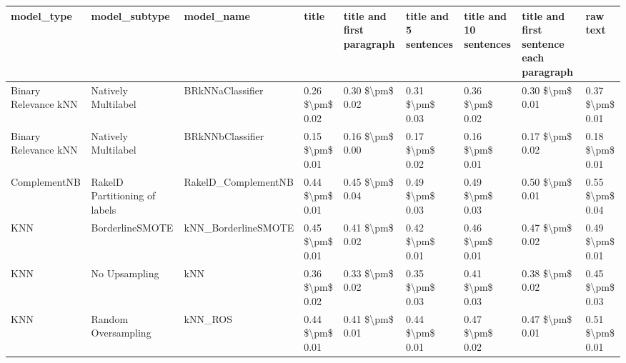 \begin{tabular}{lllllllll}
\toprule
                     model\_type &                 model\_subtype &                                   model\_name &           title & title and first paragraph & title and 5 sentences & title and 10 sentences & title and first sentence each paragraph &            raw text \\
\midrule
           Binary Relevance kNN &           Natively Multilabel &                             BRkNNaClassifier & 0.26 \$\textbackslash pm\$ 0.02 &           0.30 \$\textbackslash pm\$ 0.02 &       0.31 \$\textbackslash pm\$ 0.03 &        0.36 \$\textbackslash pm\$ 0.02 &                         0.30 \$\textbackslash pm\$ 0.01 &     0.37 \$\textbackslash pm\$ 0.01 \\
           Binary Relevance kNN &           Natively Multilabel &                             BRkNNbClassifier & 0.15 \$\textbackslash pm\$ 0.01 &           0.16 \$\textbackslash pm\$ 0.00 &       0.17 \$\textbackslash pm\$ 0.02 &        0.16 \$\textbackslash pm\$ 0.01 &                         0.17 \$\textbackslash pm\$ 0.02 &     0.18 \$\textbackslash pm\$ 0.01 \\
                   ComplementNB & RakelD Partitioning of labels &                          RakelD\_ComplementNB & 0.44 \$\textbackslash pm\$ 0.01 &           0.45 \$\textbackslash pm\$ 0.04 &       0.49 \$\textbackslash pm\$ 0.03 &        0.49 \$\textbackslash pm\$ 0.03 &                         0.50 \$\textbackslash pm\$ 0.01 &     0.55 \$\textbackslash pm\$ 0.04 \\
                            KNN &               BorderlineSMOTE &                          kNN\_BorderlineSMOTE & 0.45 \$\textbackslash pm\$ 0.01 &           0.41 \$\textbackslash pm\$ 0.02 &       0.42 \$\textbackslash pm\$ 0.01 &        0.46 \$\textbackslash pm\$ 0.01 &                         0.47 \$\textbackslash pm\$ 0.02 &     0.49 \$\textbackslash pm\$ 0.01 \\
                            KNN &                 No Upsampling &                                          kNN & 0.36 \$\textbackslash pm\$ 0.02 &           0.33 \$\textbackslash pm\$ 0.02 &       0.35 \$\textbackslash pm\$ 0.03 &        0.41 \$\textbackslash pm\$ 0.03 &                         0.38 \$\textbackslash pm\$ 0.02 &     0.45 \$\textbackslash pm\$ 0.03 \\
                            KNN &           Random Oversampling &                                      kNN\_ROS & 0.44 \$\textbackslash pm\$ 0.01 &           0.41 \$\textbackslash pm\$ 0.01 &       0.44 \$\textbackslash pm\$ 0.01 &        0.47 \$\textbackslash pm\$ 0.02 &                         0.47 \$\textbackslash pm\$ 0.01 &     0.51 \$\textbackslash pm\$ 0.01 \\

\end{tabular}
